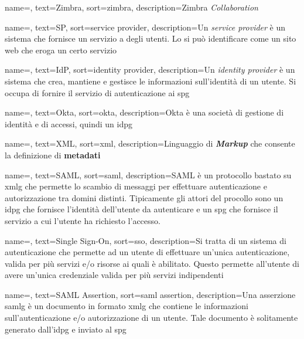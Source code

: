 
{
    name=,
    text=Zimbra,
    sort=zimbra,
    description={Zimbra \textit{Collaboration}}
}

{
    name=,
    text=SP,
    sort=service provider,
    description={Un \textit{service provider} è un sistema che fornisce un servizio a degli utenti. Lo si può identificare come un sito web che eroga un certo servizio}
}

{
    name=,
    text=IdP,
    sort=identity provider,
    description={Un \textit{identity provider} è un sistema che crea, mantiene e gestisce le informazioni sull'identità di un utente. Si occupa di fornire il servizio di autenticazione ai \gls{spg}}
}

{
    name=,
    text=Okta,
    sort=okta,
    description={Okta è una società di gestione di identità e di accessi, quindi un \gls{idpg}}
}

{
    name=,
    text=XML,
    sort=xml,
    description={Linguaggio di \textit{\textbf{Markup}} che consente la definizione di \textbf{metadati}}
}

{
    name=,
    text=SAML,
    sort=saml,
    description={SAML è un protocollo bastato su \gls{xmlg} che permette lo scambio di messaggi per effettuare autenticazione e autorizzazione tra domini distinti. Tipicamente gli attori del procollo sono un \gls{idpg} che fornisce l'identità dell'utente da autenticare e un \gls{spg} che fornisce il servizio a cui l'utente ha richiesto l'accesso. }
}

{
    name=,
    text=Single Sign-On,
    sort=sso,
    description={Si tratta di un sistema di autenticazione che permette ad un utente di effettuare un'unica autenticazione, valida per più servizi e/o risorse ai quali è abilitato. Questo permette all'utente di avere un'unica credenziale valida per più servizi indipendenti}
}

{
    name=,
    text=SAML Assertion,
    sort=saml assertion,
    description={Una asserzione \gls{samlg} è un documento in formato \gls{xmlg} che contiene le informazioni sull'autenticazione e/o autorizzazione di un utente. Tale documento è solitamente generato dall'\gls{idpg} e inviato al \gls{spg}}
}

